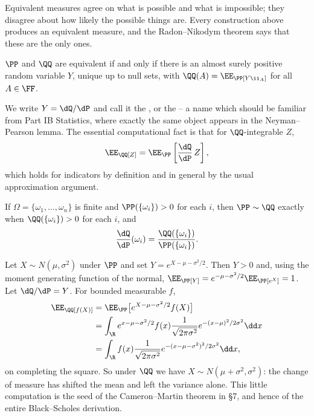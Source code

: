 Equivalent measures agree on what is possible and what is impossible; they disagree about how likely the possible things are. Every construction above produces an equivalent measure, and the Radon--Nikodym theorem says that these are the only ones.

\begin{theorem}
	$\PP$ and $\QQ$ are equivalent if and only if there is an almost surely positive random variable $Y$, unique up to null sets, with $\QQ(A) = \EE_\PP[Y \ii_A]$ for all $A \in \FF$.
\end{theorem}

We write $Y = \dQ/\dP$ and call it the , or the  -- a name which should be familiar from Part IB Statistics, where exactly the same object appears in the Neyman--Pearson lemma. The essential computational fact is that for $\QQ$-integrable $Z$,
$$
\EE_\QQ[Z] = \EE_\PP\left[\frac{\dQ}{\dP}\,Z\right],
$$
which holds for indicators by definition and in general by the usual approximation argument.

\begin{example}
	If $\Omega = \{\omega_1, \dots, \omega_n\}$ is finite and $\PP(\{\omega_i\}) > 0$ for each $i$, then $\PP \sim \QQ$ exactly when $\QQ(\{\omega_i\}) > 0$ for each $i$, and
	$$
	\frac{\dQ}{\dP}(\omega_i) = \frac{\QQ(\{\omega_i\})}{\PP(\{\omega_i\})}.
	$$
\end{example}

\begin{example}\label{ex:gaussian-tilt}
	Let $X \sim N(\mu, \sigma^2)$ under $\PP$ and set $Y = e^{X - \mu - \sigma^2/2}$. Then $Y > 0$ and, using the moment generating function of the normal, $\EE_\PP[Y] = e^{-\mu - \sigma^2/2}\EE_\PP[e^X] = 1$. Let $\dQ/\dP = Y$. For bounded measurable $f$,
	\begin{align*}
		\EE_\QQ[f(X)] &= \EE_\PP\big[e^{X-\mu-\sigma^2/2}f(X)\big]\\
		&= \int_\R e^{x - \mu - \sigma^2/2}f(x)\frac{1}{\sqrt{2\pi\sigma^2}}e^{-(x-\mu)^2/2\sigma^2}\dd x\\
		&= \int_\R f(x)\frac{1}{\sqrt{2\pi\sigma^2}}e^{-(x - \mu - \sigma^2)^2/2\sigma^2}\dd x,
	\end{align*}
	on completing the square. So under $\QQ$ we have $X \sim N(\mu + \sigma^2, \sigma^2)$: the change of measure has shifted the mean and left the variance alone. This little computation is the seed of the Cameron--Martin theorem in \S7, and hence of the entire Black--Scholes derivation.
\end{example}

